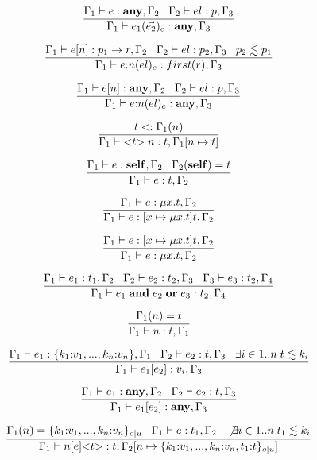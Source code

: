 \[
\dfrac{\Gamma_{1} \vdash e:\mathbf{any}, \Gamma_{2} \;\;\;
       \Gamma_{2} \vdash el:p, \Gamma_{3}}
      {\Gamma_{1} \vdash e_{1}(\vec{e_{2}})_{e}:\mathbf{any}, \Gamma_{3}}
\]

\[
\dfrac{\Gamma_{1} \vdash e[n]:p_{1} \rightarrow r, \Gamma_{2} \;\;\;
       \Gamma_{2} \vdash el:p_{2}, \Gamma_{3} \;\;\;
       p_{2} \lesssim p_{1}}
      {\Gamma_{1} \vdash e{:}n(el)_{e}:first(r), \Gamma_{3}}
\]

\[
\dfrac{\Gamma_{1} \vdash e[n]:\mathbf{any}, \Gamma_{2} \;\;\;
       \Gamma_{2} \vdash el:p, \Gamma_{3}}
      {\Gamma_{1} \vdash e{:}n(el)_{e}:\mathbf{any}, \Gamma_{3}}
\]

\[
\dfrac{t <: \Gamma_{1}(n)}
      {\Gamma_{1} \vdash {<}t{>} \; n:t, \Gamma_{1}[n \mapsto t]}
\]

\[
\dfrac{\Gamma_{1} \vdash e:\mathbf{self}, \Gamma_{2} \;\;\;
       \Gamma_{2}(\mathbf{self}) = t}
      {\Gamma_{1} \vdash e:t, \Gamma_{2}}
\]

\[
\dfrac{\Gamma_{1} \vdash e:\mu x.t, \Gamma_{2}}
      {\Gamma_{1} \vdash e:[x \mapsto \mu x.t]t, \Gamma_{2}}
\]

\[
\dfrac{\Gamma_{1} \vdash e:[x \mapsto \mu x.t]t, \Gamma_{2}}
      {\Gamma_{1} \vdash e:\mu x.t, \Gamma_{2}}
\]

\[
\dfrac{\Gamma_{1} \vdash e_{1}:t_{1}, \Gamma_{2} \;\;\;
       \Gamma_{2} \vdash e_{2}:t_{2}, \Gamma_{3} \;\;\;
       \Gamma_{3} \vdash e_{3}:t_{2}, \Gamma_{4}}
      {\Gamma_{1} \vdash e_{1} \; \mathbf{and} \; e_{2} \; \mathbf{or} \; e_{3}:t_{2}, \Gamma_{4}}
\]

\[
\dfrac{\Gamma_{1}(n) = t}
      {\Gamma_{1} \vdash n:t, \Gamma_{1}}
\]

\[
\dfrac{\Gamma_{1} \vdash e_{1}:\{k_{1}{:}v_{1}, ..., k_{n}{:}v_{n}\}, \Gamma_{1} \;\;\;
       \Gamma_{2} \vdash e_{2}:t, \Gamma_{3} \;\;\;
       \exists i \in 1{..}n \; t \lesssim k_{i}}
      {\Gamma_{1} \vdash e_{1}[e_{2}]:v_{i}, \Gamma_{3}}
\]

\[
\dfrac{\Gamma_{1} \vdash e_{1}:\mathbf{any}, \Gamma_{2} \;\;\;
       \Gamma_{2} \vdash e_{2}:t, \Gamma_{3}}
      {\Gamma_{1} \vdash e_{1}[e_{2}]:\mathbf{any}, \Gamma_{3}}
\]

\[
\dfrac{\Gamma_{1}(n) = \{ k_{1}{:}v_{1}, ..., k_{n}{:}v_{n} \}_{o|u} \;\;\;
       \Gamma_{1} \vdash e:t_{1}, \Gamma_{2} \;\;\;
       \not \exists i \in 1..n \; t_{1} \lesssim k_{i}}
      {\Gamma_{1} \vdash n[e] {<}t{>}:t, \Gamma_{2}[n \mapsto \{ k_{1}{:}v_{1}, ..., k_{n}{:}v_{n}, t_{1}{:}t\}_{o|u}]}
\]

